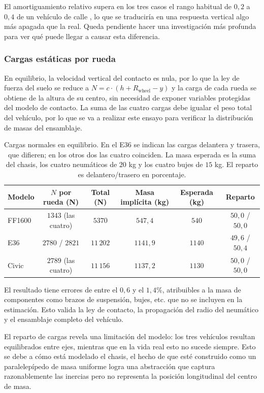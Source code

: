 El amortiguamiento relativo supera en los tres casos el rango habitual de $0{,}2$ a $0{,}4$ de un vehículo de calle \cite{giaraffa_springs3}, lo que se traduciría en una respuesta vertical algo más apagada que la real. Queda pendiente hacer una investigación más profunda para ver qué puede llegar a causar esta diferencia.


\subsubsection{Cargas estáticas por rueda}

En equilibrio, la velocidad vertical del contacto es nula, por lo que la ley de fuerza del suelo se reduce a $N = c \cdot (h + R_\text{wheel} - y)$ y la carga de cada rueda se obtiene de la altura de su centro, sin necesidad de exponer variables protegidas del modelo de contacto. La suma de las cuatro cargas debe igualar el peso total del vehículo, por lo que se va a realizar este ensayo para verificar la distribución de masas del ensamblaje.


\begin{table}[H]
	\centering
	\begin{tabular}{lccccc}
		\hline
		Modelo & $N$ por rueda (N) & Total (N) & Masa implícita (kg) & Esperada (kg) & Reparto \\
		\hline
		FF1600 & $1343$ (las cuatro) & $5370$ & $547{,}4$ & $540$ & $50{,}0$ / $50{,}0$ \\
		E36    & $2780$ / $2821$ & $11\,202$ & $1141{,}9$ & $1140$ & $49{,}6$ / $50{,}4$ \\
		Civic  & $2789$ (las cuatro) & $11\,156$ & $1137{,}2$ & $1130$ & $50{,}0$ / $50{,}0$ \\
		\hline
	\end{tabular}
	\caption[Cargas estáticas por rueda]{Cargas normales en equilibrio. En el E36 se indican las cargas delantera y trasera, que difieren; en los otros dos las cuatro coinciden. La masa esperada es la suma del chasis, los cuatro neumáticos de $20$ kg y los cuatro bujes de $15$ kg. El reparto es delantero/trasero en porcentaje.}
	\label{tab:cargas}
\end{table}

El resultado tiene errores de entre el $0{,}6$ y el $1{,}4\%$, atribuibles a la masa de componentes como brazos de suspensión, bujes, etc. que no se incluyen en la estimación. Esto valida la ley de contacto, la propagación del radio del neumático y el ensamblaje completo del vehículo. 

El reparto de cargas revela una limitación del modelo: los tres vehículos resultan equilibrados entre ejes, mientras que en la vida real esto no sucede siempre. Esto se debe a cómo está modelado el chasis, el hecho de que esté construido como un paralelepípedo de masa uniforme logra una abstracción que captura razonablemente las inercias pero no representa la posición longitudinal del centro de masa.

